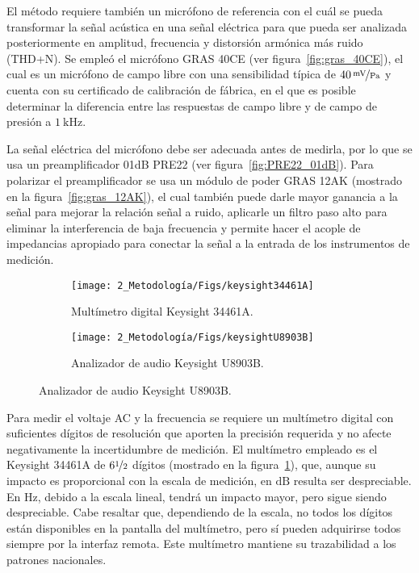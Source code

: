 El método requiere también un micrófono de referencia con el cuál se pueda transformar la señal acústica en una señal eléctrica para que pueda ser analizada posteriormente en amplitud, frecuencia y distorsión armónica más ruido (THD+N).
Se empleó el micrófono GRAS 40CE (ver figura~\ref{fig:gras_40CE}), el cual es un micrófono de campo libre con una sensibilidad típica de $\num{40}\,\nicefrac{\unit{\mV}}{\unit{\Pa}}$ y cuenta con su certificado de calibración de fábrica, en el que es posible determinar la diferencia entre las respuestas de campo libre y de campo de presión a $\qty{1}{\kHz}$.

La señal eléctrica del micrófono debe ser adecuada antes de medirla, por lo que se usa un preamplificador 01dB PRE22 (ver figura~\ref{fig:PRE22_01dB}).
Para polarizar el preamplificador se usa un módulo de poder GRAS 12AK (mostrado en la figura~\ref{fig:gras_12AK}), el cual también puede darle mayor ganancia a la señal para mejorar la relación señal a ruido, aplicarle un filtro paso alto para eliminar la interferencia de baja frecuencia y permite hacer el acople de impedancias apropiado para conectar la señal a la entrada de los instrumentos de medición.

\begin{figure}[!h]
    \caption{Instrumentos de medición para la calibración periódica de calibradores acústicos.}
    \centering
    \begin{subfigure}[t]{0.45\textwidth}
        \centering
        \texttt{[image: 2\_Metodología/Figs/keysight34461A]}
        \caption{Multímetro digital Keysight 34461A.}
        \label{fig:keysight_34461A}
    \end{subfigure}
    \hfill
    \begin{subfigure}[t]{0.45\textwidth}
        \centering
        \texttt{[image: 2\_Metodología/Figs/keysightU8903B]}
        \caption{Analizador de audio Keysight U8903B.}
        \label{fig:keysight_U8903B}
    \end{subfigure}
\end{figure}
%
Para medir el voltaje AC y la frecuencia se requiere un multímetro digital con suficientes dígitos de resolución que aporten la precisión requerida y no afecte negativamente la incertidumbre de medición.
El multímetro empleado es el Keysight 34461A de $6\nicefrac{1}{2}$ dígitos (mostrado en la figura~\ref{fig:keysight_34461A}), que, aunque su impacto es proporcional con la escala de medición, en $\unit{\dB}$ resulta ser despreciable.
En $\unit{\Hz}$, debido a la escala lineal, tendrá un impacto mayor, pero sigue siendo despreciable.
Cabe resaltar que, dependiendo de la escala, no todos los dígitos están disponibles en la pantalla del multímetro, pero sí pueden adquirirse todos siempre por la interfaz remota.
Este multímetro mantiene su trazabilidad a los patrones nacionales.

